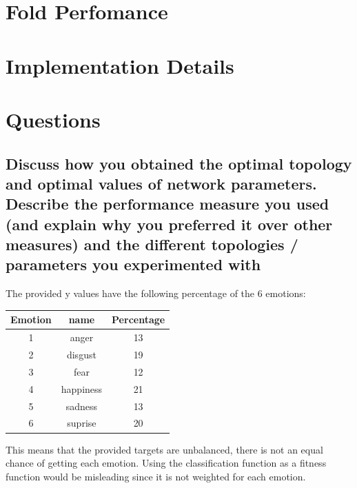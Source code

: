 \documentclass[11pt]{article}
\begin{document}
\section{Fold Perfomance}



\section{Implementation Details}
\section{Questions}

\subsection{Discuss how you obtained the optimal topology and optimal values of network parameters. Describe the performance measure you used (and explain why you preferred it over other measures) and the different topologies / parameters you experimented with}


The provided y values have the following percentage of the 6 emotions:

\begin{tabular}{c c c} %
\hline\hline %
Emotion & name & Percentage\\ [0.5ex] %
\hline %
1 & anger     & 13 \\ %
2 & disgust   & 19 \\
3 & fear      & 12 \\
4 & happiness & 21 \\
5 & sadness   & 13 \\ 
6 & suprise   & 20 \\ [1ex] %
\hline %
\end{tabular}

This means that the provided targets are unbalanced, there is not an equal chance of getting each emotion. Using the classification function as a fitness function would be misleading since it is not weighted for each emotion.
\end{document}

